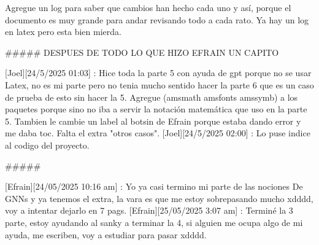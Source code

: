 Agregue un log para saber que cambios han hecho cada uno y así, porque el documento es muy grande para andar revisando todo a cada rato. Ya hay un log en latex pero esta bien mierda.

#####
DESPUES DE TODO LO QUE HIZO EFRAIN UN CAPITO

[Joel][24/5/2025 01:03] : Hice toda la parte 5 con ayuda de gpt porque no se usar Latex, no es mi parte pero no tenia mucho sentido hacer la parte 6 que es un caso de prueba de esto sin hacer la 5. Agregue ({amsmath} {amsfonts} {amssymb}) a los paquetes porque sino no iba a servir la notación matemática que uso en la parte 5. Tambien le cambie un label al botsin de Efrain porque estaba dando error y me daba toc. Falta el extra "otros casos".
[Joel][24/5/2025 02:00] : Lo puse indice al codigo del proyecto.

#####

[Efrain][24/05/2025 10:16 am] : Yo ya casi termino mi parte de las nociones De GNNs y ya tenemos el extra, la vara es que me estoy sobrepasando mucho xdddd, voy a intentar dejarlo en 7 pags.
[Efrain][25/05/2025 3:07 am] : Terminé la 3 parte, estoy ayudando al sanky a terminar la 4, si alguien me ocupa algo de mi ayuda, me escriben, voy a estudiar para pasar xdddd.